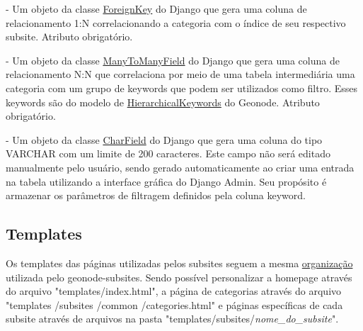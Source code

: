 \documentclass[12pt]{article}
\begin{document}
\begin{description}
  \setlength\itemsep{1em}

  \item[fk]
  - Um objeto da classe
  \textcolor{blue}
    {\href{https://docs.djangoproject.com/en/5.0/ref/models/fields/#django.db.models.ForeignKey}
    {ForeignKey}} do Django que gera uma coluna de relacionamento 1:N
    correlacionando a categoria com o índice de seu respectivo subsite.
    Atributo obrigatório.

  \item[keyword]
  - Um objeto da classe
    \textcolor{blue}
    {\href{https://docs.djangoproject.com/en/5.0/ref/models/fields/#django.db.models.ManyToManyField}
    {ManyToManyField}} do Django que gera uma coluna de relacionamento N:N que
    correlaciona por meio de uma tabela intermediária uma categoria com um
    grupo de keywords que podem ser utilizados como filtro. Esses keywords são
    do modelo de 
    \textcolor{blue}
    {\href{https://docs.geonode.org/en/master/admin/admin_panel/index.html#hierarchical-keywords}
    {HierarchicalKeywords}} do Geonode. Atributo obrigatório.

  \item[keywords\_filter\_url]
  - Um objeto da classe 
    \textcolor{blue}
    {\href{https://docs.djangoproject.com/en/5.0/ref/models/fields/#django.db.models.CharField}
    {CharField}} do Django que gera uma coluna do tipo VARCHAR com um limite de
    200 caracteres. Este campo não será editado manualmente pelo usuário, sendo
    gerado automaticamente ao criar uma entrada na tabela utilizando a
    interface gráfica do Django Admin. Seu propósito é armazenar os parâmetros
    de filtragem definidos pela coluna keyword.
\end{description}

\subsection{Templates}

Os templates das páginas utilizadas pelos subsites seguem a mesma 
  \textcolor{blue}
  {\href{https://github.com/geosolutions-it/geonode-subsites/tree/main?tab=readme-ov-file#folder-structure}
  {organização}} 
utilizada pelo geonode-subsites. Sendo possível personalizar a
homepage através do arquivo "templates/index.html", a página de categorias
através do arquivo "templates /subsites /common /categories.html" e páginas
específicas de cada subsite através de arquivos na pasta
"templates/subsites/\textit{nome\_do\_subsite}".
\end{document}
